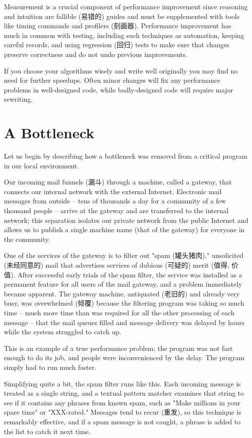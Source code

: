 Measurement is a crucial component of performance improvement since
reasoning and intuition are fallible (易错的) guides and must be
supplemented with tools like timing commands and profilers (刻画器).
Performance improvement has much in common with testing, including such
techniques as automation, keeping careful records, and using regression
(回归) tests to make sure that changes preserve correctness and do not undo
previous improvements.

If you choose your algorithms wisely and write well originally you may find
no need for further speedups. Often minor changes will fix any performance
problems in well-designed code, while badly-designed code will require
major rewriting.

\section{A Bottleneck}
\label{sec:bootleneck}
Let us begin by describing how a bottleneck was removed from a critical
program in our local environment.

Our incoming mail funnels (漏斗) through a machine, called a gateway, that
connects our internal network with the external Internet. Electronic mail
messages from outside -- tens of thousands a day for a community of a few
thousand people -- arrive at the gateway and are transferred to the
internal network; this separation isolates our private network from the
public Internet and allows us to publish a single machine name (that of the
gateway) for everyone in the community.

One of the services of the gateway is to filter out "spam (罐头猪肉),"
unsolicited (未经同意的) mail that advertises services of dubious (可疑的)
merit (值得, 价值).
After successful early trials of the spam filter, the service
was installed as a permanent feature for all users of the mail gateway, and
a problem immediately became apparent. The gateway machine, antiquated
(老旧的) and already very busy, was overwhelmed (倾覆) because the
filtering program was taking so much time -- much more time than was
required for all the other processing of each message -- that the mail
queues filled and message delivery was delayed by hours while the system
struggled to catch up.

This is an example of a true performance problem: the program was not fast
enough to do its job, and people were inconvenienced by the delay. The
program simply had to run much faster.

Simplifying quite a bit, the spam filter runs like this. Each incoming
message is treated as a single string, and a textual pattern matcher
examines that string to see if it contains any phrases from known spam,
such as "Make millions in your spare time" or "XXX-rated." Messages tend to
recur (重发), so this technique is remarkably effective, and if a spam
message is not caught, a phrase is added to the list to catch it next time.

